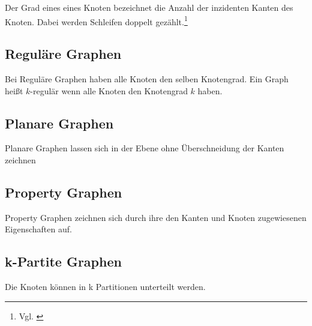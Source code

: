 Der Grad eines eines Knoten bezeichnet die Anzahl der inzidenten Kanten des Knoten. Dabei werden Schleifen doppelt gezählt.\footnote{Vgl. \cite[Seite 13]{rahm2017}}

\subsection{Reguläre Graphen}
Bei Reguläre Graphen haben alle Knoten den selben Knotengrad. Ein Graph heißt $k$-regulär wenn alle Knoten den Knotengrad $k$ haben.
\subsection{Planare Graphen}
Planare Graphen lassen sich in der Ebene ohne Überschneidung der Kanten zeichnen\cite{Theobald2016}
\subsection{Property Graphen}
Property Graphen zeichnen sich durch ihre den Kanten und Knoten zugewiesenen Eigenschaften auf.
\subsection{k-Partite Graphen}
Die Knoten können in k Partitionen unterteilt werden.

